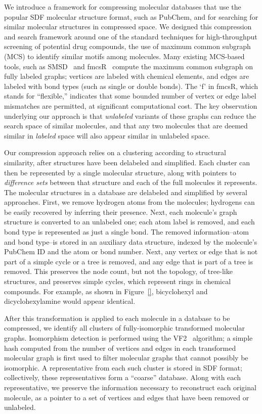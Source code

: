 \documentclass{amsbook}
\theoremstyle{definition}
\theoremstyle{remark}
\numberwithin{equation}{section}
\begin{document}
We introduce a framework for compressing molecular databases that use the popular SDF
molecular structure format, such as PubChem, and for searching for similar molecular structures in
compressed space.
We designed this compression and search framework around one of the standard techniques for high-throughput
screening of potential drug compounds, the use of maximum common subgraph (MCS) to identify similar motifs among
molecules.
Many existing MCS-based tools, such as SMSD~\cite{thornton} and 
fmcsR~\cite{girke} compute the maximum common subgraph on fully labeled graphs; vertices are labeled with
chemical elements, and edges are labeled with bond types (such as single or double bonds).
The `f' in fmcsR, which stands for ``flexible,'' indicates that some bounded number of vertex or edge label
mismatches are permitted, at significant computational cost.
The key observation underlying our approach is that \emph{unlabeled} variants of these graphs can reduce the
search space of similar molecules, and that any two molecules that are deemed similar in \emph{labeled} space
will also appear similar in unlabeled space.

Our compression approach relies on a clustering according to structural similarity, after structures have
been delabeled and simplified.
Each cluster can then be represented by a single molecular structure, along with pointers to \emph{difference
sets} between that structure and each of the full molecules it represents.
The molecular structures in a database are delabeled and simplified by several approaches.
First, we remove hydrogen atoms from the molecules; hydrogens can be easily recovered by inferring their 
presence.
Next, each molecule's graph structure is converted to an unlabeled one; each atom label is removed, and each
bond type is represented as just a single bond.
The removed information--atom and bond type--is stored in an auxiliary data structure, indexed by the molecule's
PubChem ID and the atom or bond number.
Next, any vertex or edge that is not part of a simple cycle or a tree is removed, and any edge that is part
of a tree is removed.
This preserves the node count, but not the topology, of tree-like structures, and preserves simple cycles,
which represent rings in chemical compounds.
For example, as shown in Figure~\ref{}, bicyclohexyl and dicyclohexylamine would appear identical.

After this transformation is applied to each molecule in a database to be compressed, we identify all clusters
of fully-isomorphic transformed molecular graphs.
Isomorphism detection is performed using the VF2~\cite{Cordella} algorithm; a simple hash computed from the
number of vertices and edges in each transformed molecular graph is first used to filter molecular graphs that
cannot possibly be isomorphic.
A representative from each such cluster is stored in SDF format; collectively, these representatives form a 
``coarse'' database.
Along with each representative, we preserve the information necessary to reconstruct each original molecule,
as a pointer to a set of vertices and edges that have been removed or unlabeled.
\end{document}
